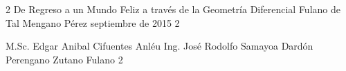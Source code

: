 \documentclass[letterpaper,12pt]{thesisECFM}
\theoremstyle{plain}
\theoremstyle{definition}
\theoremstyle{remark}
\begin{document}
\datosThesis%
{2}%
{De Regreso a un Mundo Feliz a través de la Geometría Diferencial}%
{Fulano de Tal}%
{Mengano Pérez}%
{septiembre de 2015}		%
{2}							%

\examenPrivado%
{M.Sc. Edgar Anibal Cifuentes Anléu}%
{Ing. José Rodolfo Samayoa Dardón}%
{Perengano}%
{Zutano}%
{Fulano 2}%

{\onehalfspacing	%




\par}
 
\frontmatter    %

{\onehalfspacing	%

\tableofcontents    %





\mainmatter     %




{\backmatter     %


\cleardoublepage
{}
\renewcommand{\bibname}{BIBLIOGRAF\'IA}


}


%

\par}               %
\end{document}
